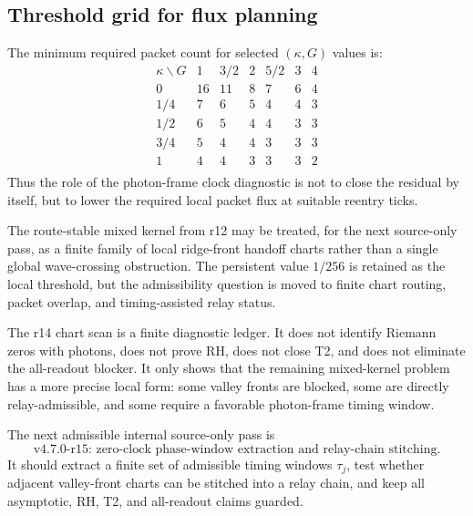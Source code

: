 \subsection{Threshold grid for flux planning}
\label{subsec:v470-r14-threshold-grid-flux-planning}

The minimum required packet count for selected \((\kappa,G)\) values is:
\[
\begin{array}{c|rrrrrr}
\kappa\backslash G & 1 & 3/2 & 2 & 5/2 & 3 & 4\\
\hline
0 & 16 & 11 & 8 & 7 & 6 & 4 \\
1/4 & 7 & 6 & 5 & 4 & 4 & 3 \\
1/2 & 6 & 5 & 4 & 4 & 3 & 3 \\
3/4 & 5 & 4 & 4 & 3 & 3 & 3 \\
1 & 4 & 4 & 3 & 3 & 3 & 2 \\
\end{array}
\]
Thus the role of the photon-frame clock diagnostic is not to close the residual
by itself, but to lower the required local packet flux at suitable reentry ticks.

\begin{corollary}
\label{cor:v470-r14-mixed-kernel-front-consequence}
The route-stable mixed kernel from r12 may be treated, for the next source-only
pass, as a finite family of local ridge-front handoff charts rather than a single
global wave-crossing obstruction.  The persistent value \(1/256\) is retained as
the local threshold, but the admissibility question is moved to finite chart
routing, packet overlap, and timing-assisted relay status.
\end{corollary}

\begin{remark}
The r14 chart scan is a finite diagnostic ledger.  It does not identify Riemann
zeros with photons, does not prove RH, does not close T2, and does not eliminate
the all-readout blocker.  It only shows that the remaining mixed-kernel problem
has a more precise local form: some valley fronts are blocked, some are directly
relay-admissible, and some require a favorable photon-frame timing window.
\end{remark}

\begin{corollary}
\label{cor:v470-r14-permitted-r15-direction}
The next admissible internal source-only pass is
\[
\text{v4.7.0-r15: zero-clock phase-window extraction and relay-chain stitching.}
\]
It should extract a finite set of admissible timing windows \(\tau_j\), test
whether adjacent valley-front charts can be stitched into a relay chain, and keep
all asymptotic, RH, T2, and all-readout claims guarded.
\end{corollary}


